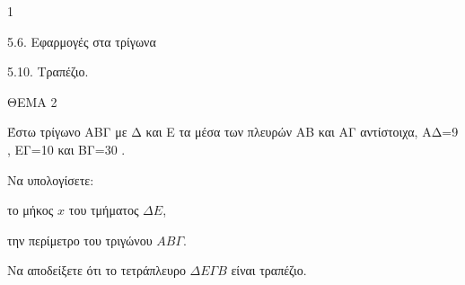 \begin{ylh}{1}
    \item 5.6. Εφαρμογές στα τρίγωνα
    \item 5.10. Τραπέζιο.
\end{ylh}

ΘΕΜΑ 2

Έστω τρίγωνο ΑΒΓ με Δ και Ε τα μέσα των πλευρών ΑΒ και ΑΓ αντίστοιχα, ΑΔ=9 , ΕΓ=10 και ΒΓ=30 .

\begin{alist}
\item Να υπολογίσετε:
\begin{rlist}
\item το μήκος $x$ του τμήματος $\Delta E$, 
\item την περίμετρο του τριγώνου $AB\Gamma$. 
\end{rlist}

\item Να αποδείξετε ότι το τετράπλευρο $\Delta E\Gamma B$ είναι τραπέζιο. 

\begin{center}
\end{center}
\end{alist}
